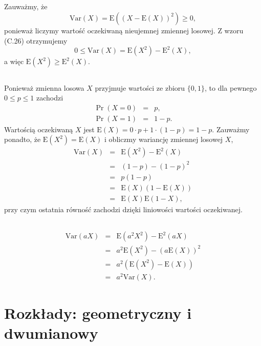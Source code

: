 \subsection{} %
Zauważmy, że
\[
	\mathrm{Var}(X) = \mathrm{E}\left((X-\mathrm{E}(X))^2\right)\ge 0,
\]
ponieważ liczymy wartość oczekiwaną nieujemnej zmiennej losowej. Z wzoru (C.26) otrzymujemy
\[
	0\le\mathrm{Var}(X) = \mathrm{E}\left(X^2\right)-\mathrm{E}^2(X),
\]
a więc $\mathrm{E}\left(X^2\right)\ge\mathrm{E}^2(X)$.

\subsection{} %
Ponieważ zmienna losowa $X$ przyjmuje wartości ze zbioru $\{ 0,1\}$, to dla pewnego $0\le p\le 1$ zachodzi
\begin{eqnarray*}
	\Pr(X=0) &=& p, \\
	\Pr(X=1) &=& 1-p.
\end{eqnarray*}
Wartością oczekiwaną $X$ jest $\mathrm{E}(X)=0\cdot p+1\cdot (1-p)=1-p$. Zauważmy ponadto, że $\mathrm{E}\left(X^2\right)=\mathrm{E}(X)$ i obliczmy wariancję zmiennej losowej $X$,
\begin{eqnarray*}
	\mathrm{Var}(X) &=& \mathrm{E}\left(X^2\right)-\mathrm{E}^2(X) \\
	&=& (1-p)-(1-p)^2 \\
	&=& p(1-p) \\
	&=& \mathrm{E}(X)(1-\mathrm{E}(X)) \\
	&=& \mathrm{E}(X)\mathrm{E}(1-X),
\end{eqnarray*}
przy czym ostatnia równość zachodzi dzięki liniowości wartości oczekiwanej.

\subsection{} %
\begin{eqnarray*}
	\mathrm{Var}(aX) &=& \mathrm{E}\left(a^2X^2\right)-\mathrm{E}^2(aX) \\
	&=& a^2\mathrm{E}\left(X^2\right)-(a\mathrm{E}(X))^2 \\
	&=& a^2\left(\mathrm{E}\left(X^2\right)-\mathrm{E}(X)\right) \\
	&=& a^2\mathrm{Var}(X).
\end{eqnarray*}

\section{Rozkłady: geometryczny i dwumianowy}
